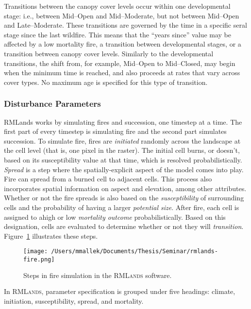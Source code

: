 Transitions between the canopy cover levels occur within one developmental stage: i.e., between Mid--Open and Mid--Moderate, but not between Mid--Open and Late--Moderate. These transitions are governed by the time in a specific seral stage since the last wildfire. This means that the ``years since'' value may be affected by a low mortality fire, a transition between developmental stages, or a transition between canopy cover levels. Similarly to the developmental transitions, the shift from, for example, Mid--Open to Mid--Closed, may begin when the minimum time is reached, and also proceeds at rates that vary across cover types. No maximum age is specified for this type of transition.

\subsubsection{Disturbance Parameters} 
\label{subsubsec:distparams}

RMLands works by simulating fires and succession, one timestep at a time. The first part of every timestep is simulating fire and the second part simulates succession. To simulate fire, fires are \emph{initiated} randomly across the landscape at the cell level (that is, one pixel in the raster). The initial cell burns, or doesn't, based on its susceptibility value at that time, which is resolved probabilistically. \emph{Spread} is a step where the spatially-explicit aspect of the model comes into play. Fire can spread from a burned cell to adjacent cells. This process also incorporates spatial information on aspect and elevation, among other attributes. Whether or not the fire spreads is also based on the \emph{susceptibility} of surrounding cells and the probability of having a larger \emph{potential size}. After fire, each cell is assigned to ahigh or low \emph{mortality outcome} probabilistically. Based on this designation, cells are evaluated to determine whether or not they will \emph{transition}. Figure~\ref{fig:rmlands-fire-steps} illustrates these steps.

\begin{figure}[htbp]
\centering
\texttt{[image: /Users/mmallek/Documents/Thesis/Seminar/rmlands-fire.png]}
\caption{Steps in fire simulation in the \textsc{RMLands} software.} 
\label{fig:rmlands-fire-steps}
\end{figure}

In \textsc{RMLands}, parameter specification is grouped under five headings: climate, initiation, susceptibility, spread, and mortality.


